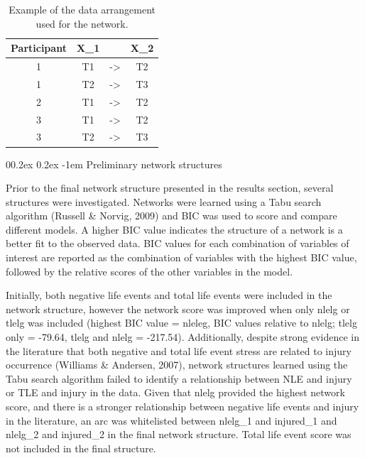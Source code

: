 \documentclass[
  english,
  man,floatsintext]{apa6}
\makeatletter
\renewcommand{\paragraph}{\@startsection{paragraph}{4}{\parindent}%
  {0\baselineskip \@plus 0.2ex \@minus 0.2ex}%
  {-1em}%
  {\normalfont\normalsize\bfseries\itshape\typesectitle}}
\makeatother
\begin{document}
\begin{table}[tbp]

\begin{center}
\begin{threeparttable}

\caption{\label{tab:exampledata}Example of the data arrangement used for the network.}

\begin{tabular}{cccc}
\toprule
Participant & \multicolumn{1}{c}{X\_1} & \multicolumn{1}{c}{ } & \multicolumn{1}{c}{X\_2}\\
\midrule
1 & T1 & -> & T2\\
1 & T2 & -> & T3\\
2 & T1 & -> & T2\\
3 & T1 & -> & T2\\
3 & T2 & -> & T3\\
\bottomrule
\end{tabular}

\end{threeparttable}
\end{center}

\end{table}

\hypertarget{preliminary-network-structures}{%
\paragraph{Preliminary network structures}\label{preliminary-network-structures}}

Prior to the final network structure presented in the results section, several structures were investigated.
Networks were learned using a Tabu search algorithm (Russell \& Norvig, 2009) and BIC was used to score and compare different models.
A higher BIC value indicates the structure of a network is a better fit to the observed data.
BIC values for each combination of variables of interest are reported as the combination of variables with the highest BIC value, followed by the relative scores of the other variables in the model.

Initially, both negative life events and total life events were included in the network structure, however the network score was improved when only nlelg or tlelg was included (highest BIC value = nleleg, BIC values relative to nlelg; tlelg only = -79.64, tlelg and nlelg = -217.54).
Additionally, despite strong evidence in the literature that both negative and total life event stress are related to injury occurrence (Williams \& Andersen, 2007), network structures learned using the Tabu search algorithm failed to identify a relationship between NLE and injury or TLE and injury in the data.
Given that nlelg provided the highest network score, and there is a stronger relationship between negative life events and injury in the literature, an arc was whitelisted between nlelg\_1 and injured\_1 and nlelg\_2 and injured\_2 in the final network structure.
Total life event score was not included in the final structure.
\end{document}
